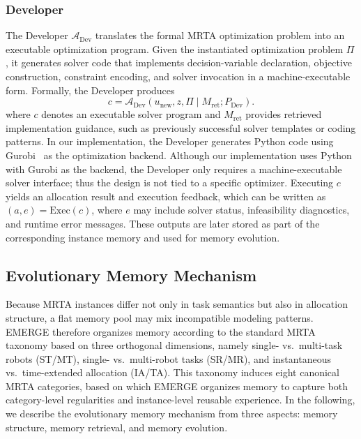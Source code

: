 \documentclass[letterpaper,journal]{IEEEtran}
\begin{document}
\subsubsection{Developer}
The Developer \(\mathcal{A}_{\mathrm{Dev}}\) translates the formal MRTA optimization problem into an executable optimization program. Given the instantiated optimization problem \(\Pi\), it generates solver code that implements decision-variable declaration, objective construction, constraint encoding, and solver invocation in a machine-executable form. Formally, the Developer produces
\begin{equation}
c=\mathcal{A}_{\mathrm{Dev}}(u_{\mathrm{new}},z,\Pi\mid M_{\mathrm{ret}};P_{\mathrm{Dev}}).
\end{equation}
where \(c\) denotes an executable solver program and \(M_{\mathrm{ret}}\) provides retrieved implementation guidance, such as previously successful solver templates or coding patterns. In our implementation, the Developer generates Python code using Gurobi~\cite{gurobi} as the optimization backend. Although our implementation uses Python with Gurobi as the backend, the Developer only requires a machine-executable solver interface; thus the design is not tied to a specific optimizer. Executing \(c\) yields an allocation result and execution feedback, which can be written as $(a,e)=\mathrm{Exec}(c)$, where \(e\) may include solver status, infeasibility diagnostics, and runtime error messages. These outputs are later stored as part of the corresponding instance memory and used for memory evolution.


\subsection{Evolutionary Memory Mechanism}
Because MRTA instances differ not only in task semantics but also in allocation structure, a flat memory pool may mix incompatible modeling patterns. EMERGE therefore organizes memory according to the standard MRTA taxonomy based on three orthogonal dimensions, namely single- vs.\ multi-task robots (ST/MT), single- vs.\ multi-robot tasks (SR/MR), and instantaneous vs.\ time-extended allocation (IA/TA). This taxonomy induces eight canonical MRTA categories, based on which EMERGE organizes memory to capture both category-level regularities and instance-level reusable experience. In the following, we describe the evolutionary memory mechanism from three aspects: memory structure, memory retrieval, and memory evolution.
\end{document}
